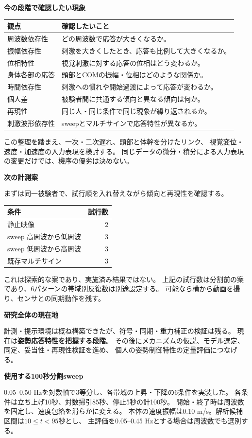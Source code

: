 \documentclass[a4paper,10pt]{ltjsarticle}
\newcommand{\sect}[1]{\vspace{4pt}\textbf{\large #1}\par}
\begin{document}
\sect{今の段階で確認したい現象}
\begin{center}
\renewcommand{\arraystretch}{1.25}
\begin{tabular}{p{30mm}p{131mm}}
\toprule
観点 & 確認したいこと\\
\midrule
周波数依存性 & どの周波数で応答が大きくなるか。\\
振幅依存性 & 刺激を大きくしたとき、応答も比例して大きくなるか。\\
位相特性 & 視覚刺激に対する応答の位相はどう変わるか。\\
身体各部の応答 & 頭部とCOMの振幅・位相はどのような関係か。\\
時間依存性 & 刺激への慣れや開始過渡によって応答が変わるか。\\
個人差 & 被験者間に共通する傾向と異なる傾向は何か。\\
再現性 & 同じ人・同じ条件で同じ現象が繰り返されるか。\\
刺激波形依存性 & sweepとマルチサインで応答特性が異なるか。\\
\bottomrule
\end{tabular}
\end{center}
この整理を踏まえ、一次・二次遅れ、頭部と体幹を分けたリンク、
視覚変位・速度・加速度の入力表現を検討する。
同じデータの微分・積分による入力表現の変更だけでは、機序の優劣は決めない。

\sect{次の計測案}
まずは同一被験者で、試行順を入れ替えながら傾向と再現性を確認する。
\begin{center}
\renewcommand{\arraystretch}{1.2}
\begin{tabular}{lr}
\toprule
条件 & 試行数\\
\midrule
静止映像 & 2\\
sweep 高周波から低周波 & 3\\
sweep 低周波から高周波 & 3\\
既存マルチサイン & 3\\
\bottomrule
\end{tabular}
\end{center}
これは探索的な案であり、実施済み結果ではない。
上記の試行数は分割前の案であり、6パターンの帯域別反復数は別途設定する。
可能なら横から動画を撮り、センサとの同期動作を残す。

\sect{研究全体の現在地}
計測・提示環境は概ね構築できたが、符号・同期・重力補正の検証は残る。
現在は\textbf{姿勢応答特性を把握する段階}。
その後にメカニズムの仮説、モデル選定、同定、妥当性・再現性検証を進め、
個人の姿勢制御特性の定量評価につなげる。

\newpage
{\LARGE\bfseries 使用する100秒分割sweep}\par
0.05--0.50 Hzを対数軸で3等分し、各帯域の上昇・下降の6条件を実装した。
各条件は立ち上げ10秒、対数掃引85秒、停止5秒の計100秒。
開始・終了時は周波数を固定し、速度包絡を滑らかに変える。
本体の速度振幅は0.10 m/s。解析候補区間は\(10\leq t<95\)秒とし、
主評価を0.05--0.45 Hzとする場合は周波数でも選別する。
\end{document}
